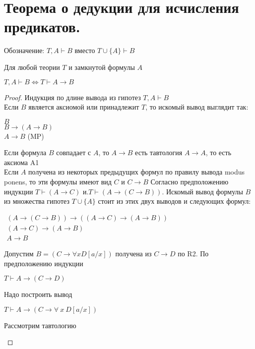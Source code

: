\section{Теорема о дедукции для исчисления предикатов.}
Обозначение: $T,A \vdash B$ вместо $T \cup \{A\} \vdash B$
\begin{theorem}
    Для любой теории $T$ и замкнутой формулы $A$
    \begin{center}
        $T, A \vdash B \Longleftrightarrow T \vdash A \rightarrow B$
    \end{center}
\end{theorem}
\begin{proof}
Индукция по длине вывода из гипотез $T,A \vdash B$\\
Если $B$ является аксиомой или принадлежит $T$, то искомый вывод выглядит так:
    \begin{center}
    $B$\\
    $B \rightarrow(A \rightarrow B)$\\
    $A \rightarrow B$   (MP)
    \end{center}
Если формула $B$ совпадает с $A$, то $A \rightarrow B$ есть тавтология $A \rightarrow A$, то есть аксиома A1\\
Если $A$ получена из некоторых предыдущих формул по правилу вывода
modus ponens, то эти формулы имеют вид $C$ и $C\rightarrow B$ Согласно предположению индукции $T \vdash (A \rightarrow C)$ и.$T \vdash (A \rightarrow (C \rightarrow B))$. Искомый вывод формулы $B$
из множества гипотез  $T \cup \{A\}$ стоит из этих двух выводов и следующих
формул:
\begin{center}
    $\begin{array}{l}
    {(A \rightarrow(C \rightarrow B)) \rightarrow((A \rightarrow C) \rightarrow(A \rightarrow B))} \\
    {(A \rightarrow C) \rightarrow(A \rightarrow B)} \\
    {A \rightarrow B}
    \end{array}$
\end{center}
Допустим $B=(C \rightarrow \forall x D[a / x])$ получена из $C \rightarrow D$ по R2. По предположению индукции
\begin{center}
    $T\vdash A \rightarrow(C\rightarrow D)$
\end{center}
Надо построить вывод
\begin{center}
    $T\vdash A \rightarrow(C\rightarrow \forall\:x\:D[a/x])$
\end{center}
Рассмотрим тавтологию
\begin{center}

\end{center}
\end{proof}
